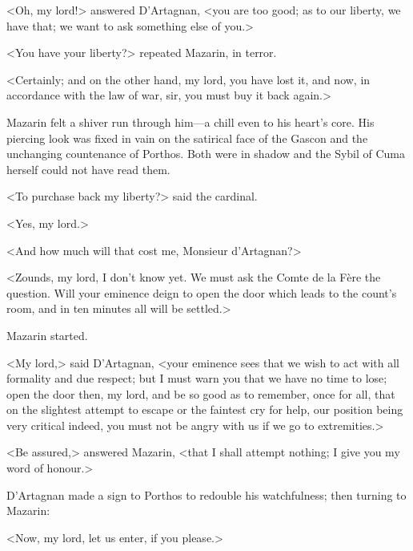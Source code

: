 <Oh, my lord!> answered D'Artagnan, <you are too good; as to our liberty, we have that; we want to ask something else of you.>

<You have your liberty?> repeated Mazarin, in terror.

<Certainly; and on the other hand, my lord, you have lost it, and now, in accordance with the law of war, sir, you must buy it back again.>

Mazarin felt a shiver run through him—a chill even to his heart's core. His piercing look was fixed in vain on the satirical face of the Gascon and the unchanging countenance of Porthos. Both were in shadow and the Sybil of Cuma herself could not have read them.

<To purchase back my liberty?> said the cardinal.

<Yes, my lord.>

<And how much will that cost me, Monsieur d'Artagnan?>

<Zounds, my lord, I don't know yet. We must ask the Comte de la Fère the question. Will your eminence deign to open the door which leads to the count's room, and in ten minutes all will be settled.>

Mazarin started.

<My lord,> said D'Artagnan, <your eminence sees that we wish to act with all formality and due respect; but I must warn you that we have no time to lose; open the door then, my lord, and be so good as to remember, once for all, that on the slightest attempt to escape or the faintest cry for help, our position being very critical indeed, you must not be angry with us if we go to extremities.>

<Be assured,> answered Mazarin, <that I shall attempt nothing; I give you my word of honour.>

D'Artagnan made a sign to Porthos to redouble his watchfulness; then turning to Mazarin:

<Now, my lord, let us enter, if you please.> 